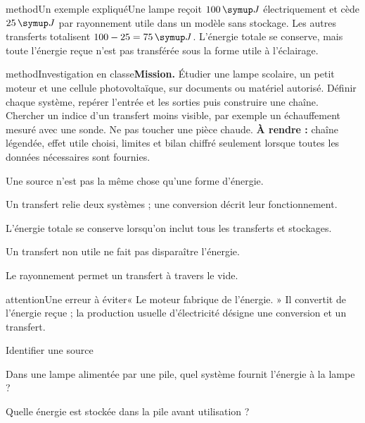 \begin{pcEncadre}{method}{Un exemple expliqué}Une lampe reçoit $100\unite J$ électriquement et cède $25\unite J$ par rayonnement utile dans un modèle sans stockage. Les autres transferts totalisent $100-25=75\unite J$. L’énergie totale se conserve, mais toute l’énergie reçue n’est pas transférée sous la forme utile à l’éclairage.\end{pcEncadre}
\label{activite-12}
\begin{pcEncadre}{method}{Investigation en classe}\textbf{Mission.} Étudier une lampe scolaire, un petit moteur et une cellule photovoltaïque, sur documents ou matériel autorisé. Définir chaque système, repérer l’entrée et les sorties puis construire une chaîne. Chercher un indice d’un transfert moins visible, par exemple un échauffement mesuré avec une sonde. Ne pas toucher une pièce chaude. \textbf{À rendre :} chaîne légendée, effet utile choisi, limites et bilan chiffré seulement lorsque toutes les données nécessaires sont fournies.\end{pcEncadre}
\begin{questions}
\item Une source n’est pas la même chose qu’une forme d’énergie.
\item Un transfert relie deux systèmes ; une conversion décrit leur fonctionnement.
\item L’énergie totale se conserve lorsqu’on inclut tous les transferts et stockages.
\item Un transfert non utile ne fait pas disparaître l’énergie.
\item Le rayonnement permet un transfert à travers le vide.
\end{questions}
\begin{pcEncadre}{attention}{Une erreur à éviter}« Le moteur fabrique de l’énergie. » Il convertit de l’énergie reçue ; la production usuelle d’électricité désigne une conversion et un transfert.\end{pcEncadre}
\pcGrille
\clearpage{}
\par\noindent\begin{minipage}{\linewidth}
\begin{exercice}[1]{Identifier une source}
\begin{questions}
\item Dans une lampe alimentée par une pile, quel système fournit l’énergie à la lampe ?
\item Quelle énergie est stockée dans la pile avant utilisation ?
\end{questions}
\end{exercice}
\end{minipage}
